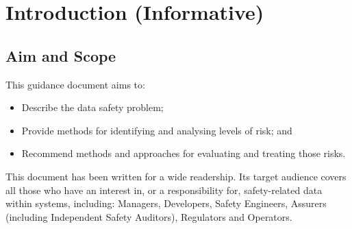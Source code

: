 %
%

%
%
\setcounter{page}{1}
\pagestyle{Standard} %
\thispagestyle{FirstPage}

\section{Introduction (Informative)} \label{bkm:introduction}


\subsection{Aim and Scope}
This guidance document aims to:
\begin{itemize}
	\item Describe the data safety problem;
	\item Provide methods for identifying and analysing levels of risk; and
	\item Recommend methods and approaches for evaluating and treating those risks.
\end{itemize}

This document has been written for a wide readership. Its target audience covers all those who have an interest in, or a responsibility for, safety-related data within systems, including: Managers, Developers, Safety Engineers, Assurers (including Independent Safety Auditors), Regulators and Operators. 

